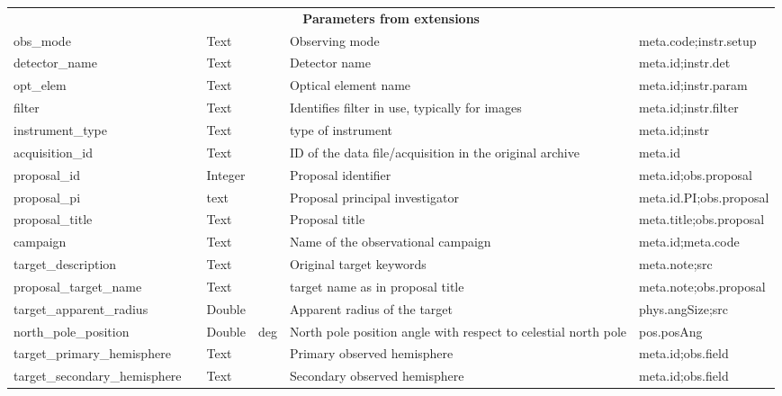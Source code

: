 \documentclass[11pt,a4paper]{ivoa}
\begin{document}
\begin{longtable}{p{3.5cm}p{0.5cm}p{1cm}p{1cm}p{7cm}p{3cm}}
\multicolumn{6}{c}{\vrule width 0pt height 20pt depth 12pt \textbf{\textbf{Parameters from extensions}}}\\

obs\_mode&&Text&&Observing mode&meta.code;instr.setup\\

detector\_name&&Text&&Detector name&meta.id;instr.det\\

opt\_elem&&Text&&Optical element name&meta.id;instr.param\\

filter&&Text& &Identifies filter in use, typically for images&meta.id;instr.filter\\

instrument\_type&&Text&&type of instrument&meta.id;instr\\

acquisition\_id&&Text&&ID of the data file/acquisition in the original archive&meta.id\\

proposal\_id&&Integer&&Proposal identifier&meta.id;obs.proposal\\

proposal\_pi&&text&&Proposal principal investigator&meta.id.PI;obs.proposal\\

proposal\_title&&Text&&Proposal title&meta.title;obs.proposal\\

campaign&&Text&&Name of the observational campaign&meta.id;meta.code\\

target\_description&&Text&&Original target keywords&meta.note;src\\

proposal\_target\_name&&Text&&target name as in proposal title&meta.note;obs.proposal\\

target\_apparent\_radius&&Double&&Apparent radius of the target&phys.angSize;src\\

north\_pole\_position&&Double&deg&North pole position angle with respect to celestial north pole&pos.posAng\\

target\_primary\_hemisphere&&Text&&Primary observed hemisphere&meta.id;obs.field\\

target\_secondary\_hemisphere&&Text&&Secondary observed hemisphere&meta.id;obs.field\\


\end{longtable}
\end{document}
